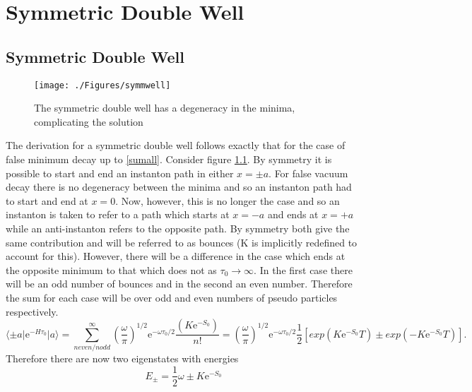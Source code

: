 
\chapter{Symmetric Double Well} %

\label{AppendixC} %

\section{Symmetric Double Well}
\begin{figure}[htbp]
	\centering
		\texttt{[image: ./Figures/symmwell]}
	\caption[Symmetric Double Well]{The symmetric double well has a degeneracy in the minima, complicating the solution}
	\label{fig:symmwell}
\end{figure}
The derivation for a symmetric double well follows exactly that for the case of false minimum decay up to \ref{sumall}. Consider figure \ref{fig:symmwell}. By symmetry it is possible to start and end an instanton path in either $x=\pm a$. For false vacuum decay there is no degeneracy between the minima and so an instanton path had to start and end at $x=0$. Now, however, this is no longer the case and so an instanton is taken to refer to a path which starts at $x=-a$ and ends at $x=+a$ while an anti-instanton refers to the opposite path. By symmetry both give the same contribution and will be referred to as bounces (K is implicitly redefined to account for this).  However, there will be a difference in the case which ends at the opposite minimum to that which does not as $\tau_0\rightarrow\infty$. In the first case there will be an odd number of bounces and in the second an even number. Therefore the sum for each case will be over odd and even numbers of pseudo particles respectively.
\begin{equation}
\langle \pm a \vert \mathrm{e}^{-H\tau_0} \vert a \rangle = \sum_{n even/n odd}^{\infty}  \left(\frac{\omega}{\pi}\right)^{1/2} \mathrm{e}^{-\omega \tau_0/2}\frac{\left(K\mathrm{e}^{-S_0}\right)}{n!}=\left(\frac{\omega}{\pi}\right)^{1/2}\mathrm{e}^{-\omega\tau_0/2}\frac{1}{2}\left[exp(K\mathrm{e}^{-S_0}T) \pm exp(-K\mathrm{e}^{-S_0}T)\right].
\end{equation}
Therefore there are now two eigenstates with energies
\begin{equation}
\label{shift}
E_{\pm} = \frac{1}{2}\omega \pm K \mathrm{e}^{-S_0}
\end{equation}
